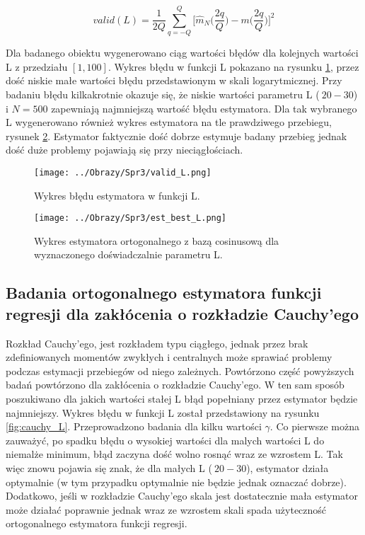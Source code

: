 \documentclass[12pt,a4paper]{article}
\begin{document}
\begin{equation}\label{eq:valid_L}
valid(L)=\frac{1}{2Q}\sum_{q=-Q}^{Q}\Bigg[\hat{m}_{N}\bigg(\frac{2q}{Q}\bigg)-m\bigg(\frac{2q}{Q}\bigg)\Bigg]^{2}
\end{equation}

Dla badanego obiektu wygenerowano ciąg wartości błędów dla kolejnych wartości L z przedziału $[1,100]$. Wykres błędu w funkcji L pokazano na rysunku \ref{fig:valid_L}, przez dość niskie małe wartości błędu przedstawionym w skali logarytmicznej.
Przy badaniu błędu kilkakrotnie okazuje się, że niskie wartości parametru L ($~20-30$) i $N=500$ zapewniają najmniejszą wartość błędu estymatora.
Dla tak wybranego L wygenerowano również wykres estymatora na tle prawdziwego przebiegu, rysunek \ref{fig:best_L}.
Estymator faktycznie dość dobrze estymuje badany przebieg jednak dość duże problemy pojawiają się przy nieciągłościach.


\begin{figure}[H]
\centering
\texttt{[image: ../Obrazy/Spr3/valid\_L.png]} 
\caption{Wykres błędu estymatora w funkcji L.}
\label{fig:valid_L}
\end{figure}

\begin{figure}[H]
\centering
\texttt{[image: ../Obrazy/Spr3/est\_best\_L.png]} 
\caption{Wykres estymatora ortogonalnego z bazą cosinusową dla wyznaczonego doświadczalnie parametru L.}
\label{fig:best_L}
\end{figure}

\subsection{Badania ortogonalnego estymatora funkcji regresji dla zakłócenia o rozkładzie Cauchy'ego}
Rozkład Cauchy'ego, jest rozkładem typu ciągłego, jednak przez brak zdefiniowanych momentów zwykłych i centralnych może sprawiać problemy podczas estymacji przebiegów od niego zależnych.
Powtórzono część powyższych badań powtórzono dla zakłócenia o rozkładzie Cauchy'ego.
W ten sam sposób poszukiwano dla jakich wartości stałej L błąd popełniany przez estymator będzie najmniejszy. Wykres błędu w funkcji L został przedstawiony na rysunku \ref{fig:cauchy_L}. Przeprowadzono badania dla kilku wartości $\gamma$.
Co pierwsze można zauważyć, po spadku błędu o wysokiej wartości dla malych wartości L do niemalże minimum, błąd zaczyna dość wolno rosnąć wraz ze wzrostem L.
Tak więc znowu pojawia się znak, że dla małych L ($~20-30$), estymator działa optymalnie (w tym przypadku optymalnie nie będzie jednak oznaczać dobrze). Dodatkowo, jeśli w rozkładzie Cauchy'ego skala jest dostatecznie mała estymator może działać poprawnie jednak wraz ze wzrostem skali spada użyteczność ortogonalnego estymatora funkcji regresji.
\end{document}

